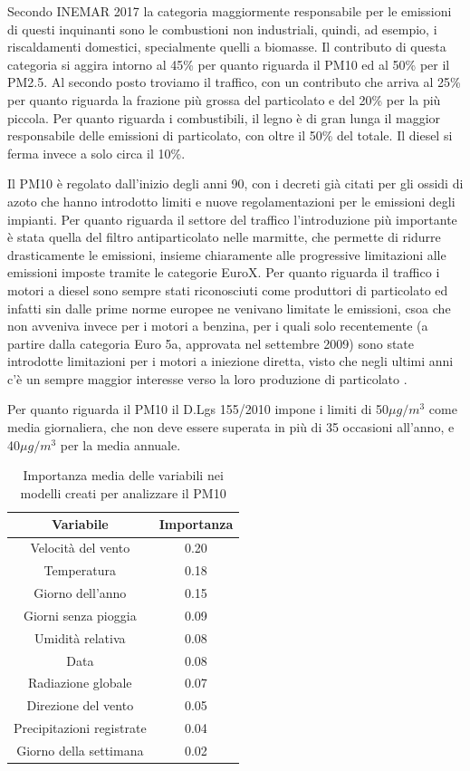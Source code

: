\documentclass[a4paper]{report}
\begin{document}
Secondo INEMAR 2017 \cite{inemar2017}
 la categoria maggiormente responsabile per le emissioni di questi inquinanti sono le combustioni non industriali, quindi, ad esempio, i riscaldamenti domestici, specialmente quelli a biomasse. Il contributo di questa categoria si aggira intorno al 45\% per quanto riguarda il PM10 ed al 50\% per il PM2.5. Al secondo posto troviamo il traffico, con un contributo che arriva al 25\% per quanto riguarda la frazione più grossa del particolato e del 20\% per la più piccola. Per quanto riguarda i combustibili, il legno è di gran lunga il maggior responsabile delle emissioni di particolato, con oltre il 50\% del totale. Il diesel si ferma invece a solo circa il 10\%.

Il PM10 è regolato dall'inizio degli anni 90, con i decreti già citati per gli ossidi di azoto che hanno introdotto limiti e nuove regolamentazioni per le emissioni degli impianti. Per quanto riguarda il settore del traffico l'introduzione più importante è stata quella del filtro antiparticolato nelle marmitte, che permette di ridurre drasticamente le emissioni, insieme chiaramente alle progressive limitazioni alle emissioni imposte tramite le categorie EuroX. 
Per quanto riguarda il traffico i motori a diesel sono sempre stati riconosciuti come produttori di particolato ed infatti sin dalle prime norme europee ne venivano limitate le emissioni, csoa che non avveniva invece per i motori a benzina, per i quali solo recentemente (a partire dalla categoria Euro 5a, approvata nel settembre 2009) sono state introdotte limitazioni per i motori a iniezione diretta, visto che negli ultimi anni c'è un sempre maggior interesse verso la loro produzione di particolato  \cite{Raza_2018}. 

Per quanto riguarda il PM10 il D.Lgs 155/2010 impone i limiti di 50$\mu g/m^3$ come media giornaliera, che non deve essere superata in più di 35 occasioni all'anno, e 40$\mu g/m^3$ per la media annuale.

\begin{table}[h!]
\centering
\begin{tabular}{ |c c| }
	\hline
	Variabile & Importanza \\
	\hline
	Velocità del vento & 0.20 \\
	Temperatura & 0.18 \\
	Giorno dell'anno & 0.15 \\
	Giorni senza pioggia & 0.09 \\
	Umidità relativa & 0.08 \\
	Data & 0.08 \\
	Radiazione globale & 0.07 \\
	Direzione del vento & 0.05 \\
	Precipitazioni registrate & 0.04 \\
	Giorno della settimana & 0.02 \\
	\hline
\end{tabular}
\caption{Importanza media delle variabili nei modelli creati per analizzare il PM10}
\label{table:importanza_pm10}
\end{table}
\end{document}
